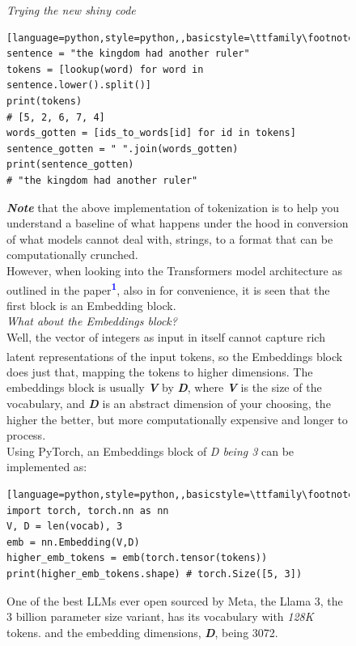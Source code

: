 \documentclass[12pt]{article}
\newcommand{\customtext}[3]{%
    \vspace{#2} %
    \fontsize{13}{8}\textcolor{#1}{\textit{#3}}%
}
\newcommand{\bandi}[1]{\textbf{\textit{#1}}}
\newcommand{\sidecite}[1]{\textsuperscript{\textcolor{blue}{\textbf{\scriptsize#1}}}}
\newcommand{\maincitecount}{\sidecite{\stepcounter{maincite}\themaincite}}
\begin{document}
\begin{figure}[!htb]
    \begin{minipage}[t]{0.65\textwidth}
    \raggedright
    \customtext{xtitle}{0em}{Trying the new shiny code}\\
\begin{lstlisting}[language=python,style=python,,basicstyle=\ttfamily\footnotesize]
sentence = "the kingdom had another ruler"
tokens = [lookup(word) for word in sentence.lower().split()]
print(tokens)
# [5, 2, 6, 7, 4]
words_gotten = [ids_to_words[id] for id in tokens]
sentence_gotten = " ".join(words_gotten)
print(sentence_gotten)
# "the kingdom had another ruler"
\end{lstlisting}
\textbf{\textit{\small Note}} that the above implementation of tokenization is to help you understand a baseline of what happens 
under the hood in conversion of what models cannot deal with, strings, to a format that can be computationally 
crunched.\\
However, when looking into the Transformers model architecture as outlined in the paper\sidecite{1}, also in{\maincitecount}
for convenience, it is seen that the first block is an Embedding block.\\
\customtext{xtitle}{1em}{What about the Embeddings block?}\\
Well, the vector of integers as input in itself cannot capture rich latent representations of the input tokens, 
so the Embeddings block{\maincitecount} does just that, mapping the tokens to higher dimensions. The embeddings block is usually 
\bandi{V} by \bandi{D}, where \bandi{V} is the size of the vocabulary, and \bandi{D} is an abstract dimension of your choosing, 
the higher the better, but more computationally expensive and longer to process.\\
Using PyTorch, an Embeddings block of {\it D being 3} can be implemented as:
\begin{lstlisting}[language=python,style=python,,basicstyle=\ttfamily\footnotesize]
import torch, torch.nn as nn 
V, D = len(vocab), 3
emb = nn.Embedding(V,D)
higher_emb_tokens = emb(torch.tensor(tokens))
print(higher_emb_tokens.shape) # torch.Size([5, 3])
\end{lstlisting}
One of the best LLMs ever open sourced by Meta, the Llama 3, the 3 billion parameter size variant, has its vocabulary with {\it 128K} tokens.
and the embedding dimensions, \bandi{D}, being 3072.
    \end{minipage}%
    \hspace{25pt}
    \begin{minipage}[t]{.4\textwidth}

\end{minipage}
\end{figure}
\end{document}
